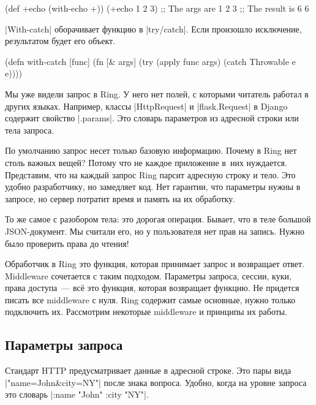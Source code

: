 \begin{english}
  \begin{clojure}
(def +echo (with-echo +))
(+echo 1 2 3)
;; The args are 1 2 3
;; The result is 6
6
  \end{clojure}
\end{english}

\spverb|With-catch| оборачивает функцию в \spverb|try/catch|. Если произошло
исключение, результатом будет его объект.

\begin{english}
  \begin{clojure}
(defn with-catch [func]
  (fn [& args]
    (try
      (apply func args)
      (catch Throwable e
        e))))
  \end{clojure}
\end{english}

Мы уже видели запрос в Ring. У него нет полей, с которыми читатель работал в
других языках. Например, классы \spverb|HttpRequest| и \spverb|flask.Request| в
Django содержит свойство \spverb|.params|. Это словарь параметров из адресной
строки или тела запроса.


По умолчанию запрос несет только базовую информацию. Почему в Ring нет столь
важных вещей? Потому что не каждое приложение в~них нуждается. Представим, что
на каждый запрос Ring парсит адресную строку и тело. Это удобно разработчику, но
замедляет код. Нет гарантии, что параметры нужны в запросе, но сервер потратит
время и память на их обработку.

То же самое с разобором тела: это дорогая операция. Бывает, что в теле большой
JSON-документ. Мы считали его, но у пользователя нет прав на запись. Нужно было
проверить права до чтения!

Обработчик в Ring это функция, которая принимает запрос и возвращает
ответ. Middleware сочетается с таким подходом. Параметры запроса, сессии, куки,
права доступа~--- вс\"{е} это функция, которая возвращает функцию. Не придется
писать все middleware с нуля. Ring содержит самые основные, нужно только
подключить их. Рассмотрим некоторые middleware и принципы их работы.

\subsection{Параметры запроса}

\label{ring-params}

Стандарт HTTP предусматривает данные в адресной строке. Это пары вида
\spverb|"name=John&city=NY"| после знака вопроса. Удобно, когда на уровне
запроса это словарь \spverb|{:name "John" :city "NY"}|.

